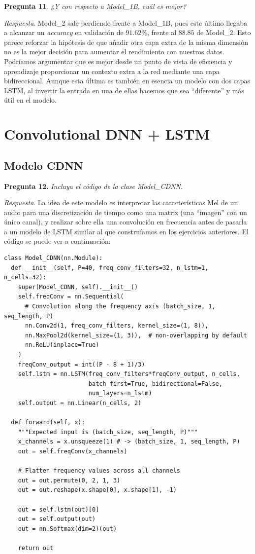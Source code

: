 \documentclass[11pt]{article}
\begin{document}
\textbf{Pregunta 11}. \textit{¿Y con respecto a Model\_1B, cuál es mejor?}

\textit{Respuesta}. Model\_2 sale perdiendo frente a Model\_1B, pues este último llegaba a alcanzar un \textit{accuracy} en validación de $91.62\%$, frente al $88.85$ de Model\_2. Esto parece reforzar la hipótesis de que añadir otra capa extra de la misma dimensión no es la mejor decisión para aumentar el rendimiento con nuestros datos. Podríamos argumentar que es mejor desde un punto de vista de eficiencia y aprendizaje proporcionar un contexto extra a la red mediante una capa bidireccional. Aunque esta última es también en esencia un modelo con dos capas LSTM, al invertir la entrada en una de ellas hacemos que sea ``diferente'' y más útil en el modelo.

\section{Convolutional DNN + LSTM}
\label{sec:2}

\subsection{Modelo CDNN}

\textbf{Pregunta 12.} \textit{Incluya el código de la clase Model\_CDNN}.

\textit{Respuesta}. La idea de este modelo es interpretar las características Mel de un audio para una discretización de tiempo como una matriz (una ``imagen'' con un único canal), y realizar sobre ella una convolución en frecuencia antes de pasarla a un modelo de LSTM similar al que construíamos en los ejercicios anteriores. El código se puede ver a continuación:

\begin{verbatim}
class Model_CDNN(nn.Module):
  def __init__(self, P=40, freq_conv_filters=32, n_lstm=1, n_cells=32):
    super(Model_CDNN, self).__init__()
    self.freqConv = nn.Sequential(
      # Convolution along the frequency axis (batch_size, 1, seq_length, P)
      nn.Conv2d(1, freq_conv_filters, kernel_size=(1, 8)),
      nn.MaxPool2d(kernel_size=(1, 3)),  # non-overlapping by default
      nn.ReLU(inplace=True)
    )
    freqConv_output = int((P - 8 + 1)/3)
    self.lstm = nn.LSTM(freq_conv_filters*freqConv_output, n_cells,
                        batch_first=True, bidirectional=False,
                        num_layers=n_lstm)
    self.output = nn.Linear(n_cells, 2)

  def forward(self, x):
    """Expected input is (batch_size, seq_length, P)"""
    x_channels = x.unsqueeze(1) # -> (batch_size, 1, seq_length, P)
    out = self.freqConv(x_channels)

    # Flatten frequency values across all channels
    out = out.permute(0, 2, 1, 3)
    out = out.reshape(x.shape[0], x.shape[1], -1)

    out = self.lstm(out)[0]
    out = self.output(out)
    out = nn.Softmax(dim=2)(out)

    return out
\end{verbatim}
\end{document}
